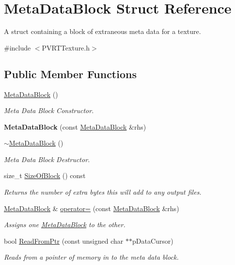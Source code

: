 \hypertarget{struct_meta_data_block}{\section{Meta\+Data\+Block Struct Reference}
\label{struct_meta_data_block}
}


A struct containing a block of extraneous meta data for a texture.  




{\ttfamily \#include $<$P\+V\+R\+T\+Texture.\+h$>$}

\subsection*{Public Member Functions}
\begin{DoxyCompactItemize}
\item 
\hyperlink{struct_meta_data_block_a80bd1a60900d57af87f64962cdf9f6c0}{Meta\+Data\+Block} ()
\begin{DoxyCompactList}\small\item\em Meta Data Block Constructor. \end{DoxyCompactList}\item 
\hypertarget{struct_meta_data_block_aff4210b154285644f93e56582a28a45e}{{\bfseries Meta\+Data\+Block} (const \hyperlink{struct_meta_data_block}{Meta\+Data\+Block} \&rhs)}\label{struct_meta_data_block_aff4210b154285644f93e56582a28a45e}

\item 
\hyperlink{struct_meta_data_block_aeb1a26d46c7187c01eb019f028833e06}{$\sim$\+Meta\+Data\+Block} ()
\begin{DoxyCompactList}\small\item\em Meta Data Block Destructor. \end{DoxyCompactList}\item 
size\+\_\+t \hyperlink{struct_meta_data_block_a5ec779853e4a7616a90ea5de74b1ffb7}{Size\+Of\+Block} () const 
\begin{DoxyCompactList}\small\item\em Returns the number of extra bytes this will add to any output files. \end{DoxyCompactList}\item 
\hyperlink{struct_meta_data_block}{Meta\+Data\+Block} \& \hyperlink{struct_meta_data_block_ac50c45b7bb6c5b00118750e52cb6f028}{operator=} (const \hyperlink{struct_meta_data_block}{Meta\+Data\+Block} \&rhs)
\begin{DoxyCompactList}\small\item\em Assigns one \hyperlink{struct_meta_data_block}{Meta\+Data\+Block} to the other. \end{DoxyCompactList}\item 
bool \hyperlink{struct_meta_data_block_adfb6189bf6c0e132d5913baef4c209b3}{Read\+From\+Ptr} (const unsigned char $\ast$$\ast$p\+Data\+Cursor)
\begin{DoxyCompactList}\small\item\em Reads from a pointer of memory in to the meta data block. \end{DoxyCompactList}\end{DoxyCompactItemize}

